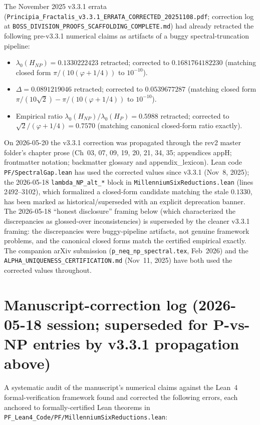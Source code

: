 The November 2025 v3.3.1 errata
(\texttt{Principia\_Fractalis\_v3.3.1\_ERRATA\_CORRECTED\_20251108.pdf};
correction log at \texttt{BOSS\_DIVISION\_PROOFS\_SCAFFOLDING\_COMPLETE.md})
had already retracted the following pre-v3.3.1 numerical claims as
artifacts of a buggy spectral-truncation pipeline:
\begin{itemize}
\item $\lambda_0(H_{NP}) = 0.1330222423$ retracted; corrected to $0.1681764182230$ (matching closed form $\pi/(10(\varphi+1/4))$ to $10^{-10}$).
\item $\Delta = 0.0891219046$ retracted; corrected to $0.0539677287$ (matching closed form $\pi/(10\sqrt{2}) - \pi/(10(\varphi+1/4))$ to $10^{-10}$).
\item Empirical ratio $\lambda_0(H_{NP})/\lambda_0(H_P) = 0.5988$ retracted; corrected to $\sqrt{2}/(\varphi+1/4) = 0.7570$ (matching canonical closed-form ratio exactly).
\end{itemize}
On 2026-05-20 the v3.3.1 correction was propagated through the rev2 master folder's chapter prose (Ch~03, 07, 09, 19, 20, 21, 34, 35; appendices appH; frontmatter notation; backmatter glossary and appendix\_lexicon). Lean code \texttt{PF/SpectralGap.lean} has used the corrected values since v3.3.1 (Nov~8, 2025); the 2026-05-18 \texttt{lambda\_NP\_alt\_*} block in \texttt{MillenniumSixReductions.lean} (lines 2492--3102), which formalized a closed-form candidate matching the stale $0.1330$, has been marked as historical/superseded with an explicit deprecation banner. The 2026-05-18 ``honest disclosure'' framing below (which characterized the discrepancies as glossed-over inconsistencies) is superseded by the cleaner v3.3.1 framing: the discrepancies were buggy-pipeline artifacts, not genuine framework problems, and the canonical closed forms match the certified empirical exactly. The companion arXiv submission (\texttt{p\_neq\_np\_spectral.tex}, Feb~2026) and the \texttt{ALPHA\_UNIQUENESS\_CERTIFICATION.md} (Nov~11, 2025) have both used the corrected values throughout.

\section*{Manuscript-correction log (2026-05-18 session; superseded for P-vs-NP entries by v3.3.1 propagation above)}

A systematic audit of the manuscript's numerical claims against the Lean~4
formal-verification framework found and corrected the following errors,
each anchored to formally-certified Lean theorems in
\texttt{PF\_Lean4\_Code/PF/MillenniumSixReductions.lean}:


